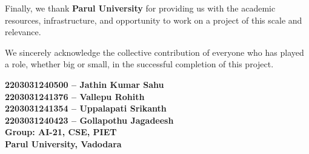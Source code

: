 Finally, we thank \textbf{Parul University} for providing us with the academic resources, infrastructure, and opportunity to work on a project of this scale and relevance.

We sincerely acknowledge the collective contribution of everyone who has played a role, whether big or small, in the successful completion of this project.

\vspace{1cm}

\begin{flushright}
\begin{minipage}{0.55\textwidth}
\raggedleft
\textbf{
2203031240500 – Jathin Kumar Sahu\\
2203031241376 – Vallepu Rohith\\
2203031241354 – Uppalapati Srikanth\\
2203031240423 – Gollapothu Jagadeesh\\[2mm]
Group: AI-21, CSE, PIET\\
Parul University, Vadodara
}
\end{minipage}
\end{flushright}

